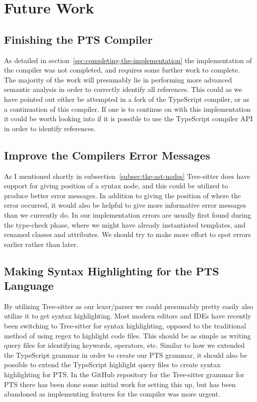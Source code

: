 \section{Future Work}\label{sec:future-work}

\subsection{Finishing the PTS Compiler}\label{subsec:finishing-the-pts-compiler}

As detailed in section~\vref{sec:completing-the-implementation} the implementation of the compiler was not completed, and requires some further work to complete.
The majority of the work will presumably lie in performing more advanced semantic analysis in order to correctly identify all references.
This could as we have pointed out either be attempted in a fork of the TypeScript compiler, or as a continuation of this compiler.
If one is to continue on with this implementation it could be worth looking into if it is possible to use the TypeScript compiler API in order to identify references.

\subsection{Improve the Compilers Error Messages}\label{subsec:compiler-with-focus-on-error-messages}

As I mentioned shortly in subsection~\vref{subsec:the-ast-nodes} Tree-sitter does have support for giving position of a syntax node, and this could be utilized to produce better error messages.
In addition to giving the position of where the error occurred, it would also be helpful to give more informative error messages than we currently do.
In our implementation errors are usually first found during the type-check phase, where we might have already instantiated templates, and renamed classes and attributes.
We should try to make more effort to spot errors earlier rather than later.

\subsection{Making Syntax Highlighting for the PTS Language}\label{subsec:making-syntax-highligthing-for-the-pts-language}

By utilizing Tree-sitter as our lexer/parser we could presumably pretty easily also utilize it to get syntax highlighting.
Most modern editors and IDEs have recently been switching to Tree-sitter for syntax highlighting, opposed to the traditional method of using regex to highlight code files.
This should be as simple as writing query files for identifying keywords, operators, etc.
Similar to how we extended the TypeScript grammar in order to create our PTS grammar, it should also be possible to extend the TypeScript highlight query files to create syntax highlighting for PTS\@.
In the GitHub repository for the Tree-sitter grammar for PTS there has been done some initial work for setting this up, but has been abandoned as implementing features for the compiler was more urgent.

